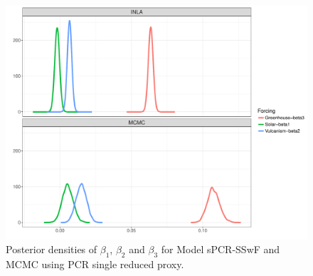 \documentclass[11pt]{amsart}
\theoremstyle{plain}
\theoremstyle{definition}
\theoremstyle{remark}
\begin{document}

\begin{figure}[H]
  \centering
  \includegraphics[scale=0.45]{PlotBetas}
  \caption{Posterior densities of $\beta_1$, $\beta_2$ and $\beta_3$ for Model
    sPCR-SSwF and MCMC using PCR single reduced proxy.}
  \label{fig:betas}
\end{figure}


\end{document}
